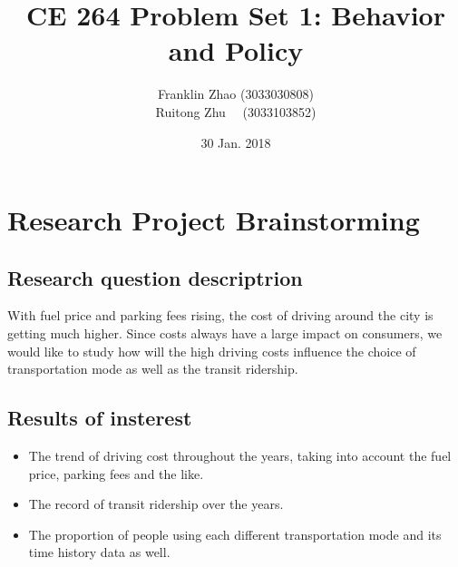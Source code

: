\documentclass[12pt]{article}
\title{CE 264 Problem Set 1: Behavior and Policy}
\date{30 Jan. 2018}
\author{Franklin Zhao (3033030808)\\ Ruitong Zhu \ \  (3033103852)}
\begin{document}
	
	\maketitle
	\renewcommand\theequation{\arabic{equation}}
	\renewcommand{\figurename}{Fig.}
	\renewcommand\thesection{Part \Roman{section}}
	\renewcommand\thesubsection{\arabic{subsection}.}
	\onehalfspacing
	
\section{Research Project Brainstorming}
\subsection{Research question descriptrion}
With fuel price and parking fees rising, the cost of driving around the city is getting much higher. Since costs always have a large impact on consumers, we would like to study how will the high driving costs influence the choice of transportation mode as well as the transit ridership.
\subsection{Results of insterest}
\begin{itemize}[noitemsep, topsep=0pt, leftmargin=*]
\item The trend of driving cost throughout the years, taking into account the fuel price, parking fees and the like. 
\item The record of transit ridership over the years.
\item The proportion of people using each different transportation mode and its time history data as well.
\end{itemize}
\end{document}
